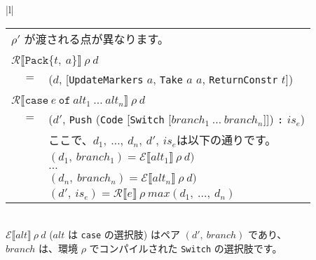 \documentclass{jarticle}
\begin{document}
\begin{tabular} {|l|}
\begin{tabular}{r c l}
		\multicolumn{3}{l}{$\rho'$ が渡される点が異なります。}                                                                                                                             \\
		\\
		\multicolumn{3}{l}{$\mathcal{R} \llbracket \texttt{Pack\{} t, ~ a \texttt{\}} \rrbracket ~ \rho ~ d$}                                                                              \\
		 & $=$ & ($d$, [\texttt{UpdateMarkers} $a$, \texttt{Take} $a$ $a$, \texttt{ReturnConstr} $t$])                                                                                     \\
		\\
		\multicolumn{3}{l}{$\mathcal{R} \llbracket \texttt{case} ~ e ~ \texttt{of} ~ alt_1 ~ \ldots ~ alt_n \rrbracket ~ \rho ~ d$}                                                        \\
		 & $=$ & ($d'$, \texttt{Push} (\texttt{Code} [\texttt{Switch} [$branch_1 ~ \ldots ~ branch_n$]]) \texttt{:} $is_e$)                                                                \\
		 &     & ここで、$d_1, ~ \ldots, ~ d_n, ~ d', ~ is_e$は以下の通りです。                                                                                                            \\
		 &     & $(d_1, ~ branch_1) = \mathcal{E} \llbracket alt_1 \rrbracket ~ \rho ~ d)$                                                                                                 \\
		 &     & $\dots$                                                                                                                                                                   \\
		 &     & $(d_n, ~ branch_n) = \mathcal{E} \llbracket alt_n \rrbracket ~ \rho ~ d)$                                                                                                 \\
		 &     & $(d', ~ is_e) = \mathcal{R} \llbracket e \rrbracket ~ \rho ~ max(d_1, ~ \ldots, ~ d_n)$                                                                                   \\
	\end{tabular}
	\\ \hline
	$\mathcal{E} \llbracket alt \rrbracket ~ \rho ~ d$ ($alt$ は \texttt{case} の選択肢) はペア $(d', ~ branch)$ であり、 \\
	$branch$ は、環境 $\rho$ でコンパイルされた \texttt{Switch} の選択肢です。                                            \\

\end{tabular}
\end{document}
